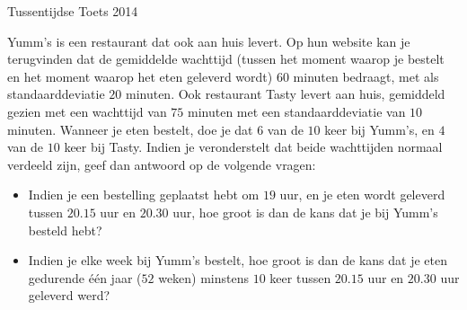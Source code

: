 \documentclass[main.tex]{subfiles}
\begin{document}
\begin{examenvraag}{Tussentijdse Toets 2014}
  \begin{ex-vraag}
    Yumm's is een restaurant dat ook aan huis levert.
    Op hun website kan je terugvinden dat de gemiddelde wachttijd (tussen het moment waarop je bestelt en het moment waarop het eten geleverd wordt) $60$ minuten bedraagt, met als standaarddeviatie $20$ minuten.
    Ook restaurant Tasty levert aan huis, gemiddeld gezien met een wachttijd van $75$ minuten met een standaarddeviatie van $10$ minuten.
    Wanneer je eten bestelt, doe je dat $6$ van de $10$ keer bij Yumm's, en $4$ van de $10$ keer bij Tasty.
    Indien je veronderstelt dat beide wachttijden normaal verdeeld zijn, geef dan antwoord op de volgende vragen:
    \begin{itemize}
    \item Indien je een bestelling geplaatst hebt om $19$ uur, en je eten wordt geleverd tussen $20.15$ uur en $20.30$ uur, hoe groot is dan de kans dat je bij Yumm's besteld hebt?
    \item Indien je elke week bij Yumm's bestelt, hoe groot is dan de kans dat je eten gedurende \'e\'en jaar ($52$ weken) minstens $10$ keer tussen $20.15$ uur en $20.30$ uur geleverd werd?
    \end{itemize}
  \end{ex-vraag}


\end{examenvraag}
\end{document}
